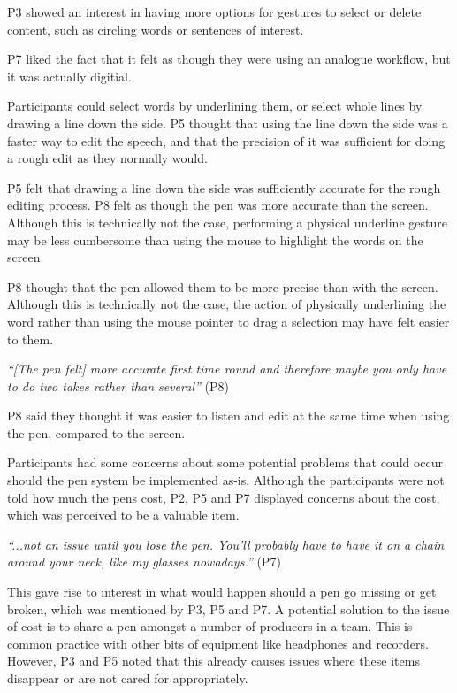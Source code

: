 P3 showed an interest in having more options for gestures to select or delete content, such as circling words or
sentences of interest.


P7 liked the fact that it felt as though they were using an analogue workflow, but it was actually digitial.


Participants could select words by underlining them, or select whole lines by drawing a line down the side. P5 thought
that using the line down the side was a faster way to edit the speech, and that the precision of it was sufficient for
doing a rough edit as they normally would.

P5 felt that drawing a line down the side was sufficiently accurate for the rough editing process. P8 felt as though
the pen was more accurate than the screen. Although this is technically not the case, performing a physical underline
gesture may be less cumbersome than using the mouse to highlight the words on the screen.

P8 thought that the pen allowed them to be more precise than with the screen. Although this is technically not the
case, the action of physically underlining the word rather than using the mouse pointer to drag a selection may have
felt easier to them.

\textit{``[The pen felt] more accurate first time round and therefore maybe you only have to do two takes rather than
several''} (P8)

P8 said they thought it was easier to listen and edit at the same time when using the pen, compared to the screen.



Participants had some concerns about some potential problems that could occur should the pen system be implemented
as-is.  Although the participants were not told how much the pens cost, P2, P5 and P7 displayed concerns about the
cost, which was perceived to be a valuable item.

\textit{``...not an issue until you lose the pen. You'll probably have to have it on a chain around your neck, like my
glasses nowadays.''} (P7)

This gave rise to interest in what would happen should a pen go missing or get broken, which was mentioned by P3, P5
and P7.  A potential solution to the issue of cost is to share a pen amongst a number of producers in a team. This is
common practice with other bits of equipment like headphones and recorders. However, P3 and P5 noted that this already
causes issues where these items disappear or are not cared for appropriately.

